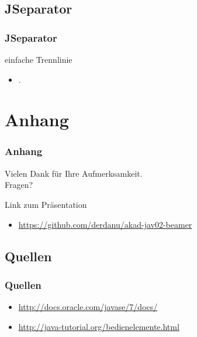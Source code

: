 \documentclass[xcolor=dvipsnames]{beamer}
\begin{document}
\subsection{JSeparator}
\begin{frame} %
  \frametitle{JSeparator
} %
  \begin{block}{einfache Trennlinie}
	  \begin{itemize}
		\item .
	  \end{itemize}
  \end{block}
\end{frame}



\section{Anhang}
\begin{frame}
  \frametitle{Anhang} %
	\begin{block}{}	
		\begin{center}
			Vielen Dank für Ihre Aufmerksamkeit. \\
			Fragen?
		\end{center}	
	\end{block}
	\begin{block}{Link zum Präsentation}	
		\begin{itemize}
			\item \url{https://github.com/derdanu/akad-jav02-beamer}
		\end{itemize}
	\end{block}
\end{frame}

\subsection{Quellen}
\begin{frame} %
  \frametitle{Quellen} %
 	\begin{itemize}
		\item \url{http://docs.oracle.com/javase/7/docs/}	
		\item \url{http://java-tutorial.org/bedienelemente.html}
	\end{itemize}
\end{frame}
\end{document}
